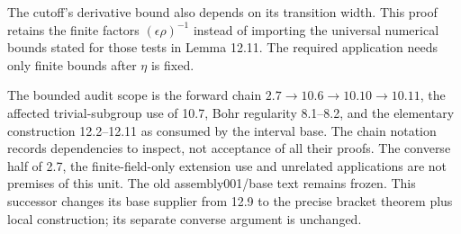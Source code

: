 \documentclass[11pt]{article}
\begin{document}
The cutoff's derivative bound also depends on its transition width.
This proof retains the finite factors $(\epsilon\rho)^{-1}$ instead
of importing the universal numerical bounds stated for those tests
in Lemma 12.11. The required application needs only finite bounds
after $\eta$ is fixed.

The bounded audit scope is the forward chain
$2.7\to10.6\to10.10\to10.11$, the affected trivial-subgroup use
of 10.7, Bohr regularity 8.1--8.2, and the elementary construction
12.2--12.11 as consumed by the interval base. The chain notation
records dependencies to inspect, not acceptance of all their proofs.
The converse half of 2.7, the finite-field-only extension use and
unrelated applications are not premises of this unit. The old
assembly001/base text remains frozen. This successor changes its
base supplier from 12.9 to the precise bracket theorem plus local
construction; its separate converse argument is unchanged.
\end{document}
